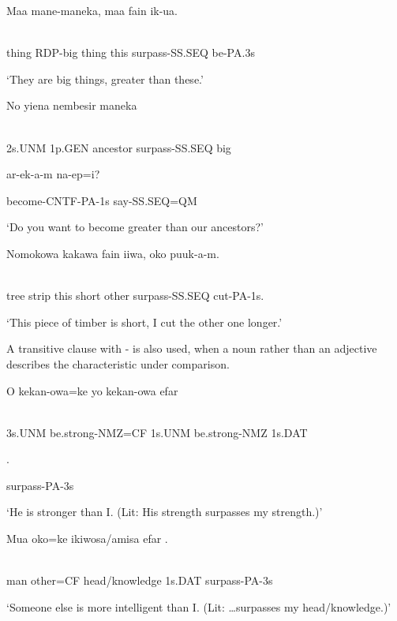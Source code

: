 \ea%
\label{ex:x1327}
\gll Maa  mane-maneka,  maa  fain    ik-ua. \\
      \\
\glt
\z

thing  RDP-big  thing  this  surpass-SS.SEQ  be-PA.3s

`They are big things, greater than these.'

\ea%
\label{ex:x1328}
\gll No  yiena  nembesir    maneka \\
      \\
\glt
\z

2s.UNM  1p.GEN  ancestor  surpass-SS.SEQ  big

ar-ek-a-m  na-ep=i?

become-CNTF-PA-1s  say-SS.SEQ=QM

`Do you want to become greater than our ancestors?'

\ea%
\label{ex:x1333}
\gll Nomokowa  kakawa  fain  iiwa,  oko    puuk-a-m. \\
      \\
\glt
\z

tree  strip  this  short  other  surpass-SS.SEQ  cut-PA-1s.

`This piece of timber is short, I cut the other one longer.'

A transitive clause with - is also used, when a noun rather than an adjective describes the characteristic under comparison. 

\ea%
\label{ex:x1329}
\gll O  kekan-owa=ke  yo  kekan-owa  efar \\
      \\
\glt
\z

3s.UNM  be.strong-NMZ=CF  1s.UNM  be.strong-NMZ  1s.DAT

.

surpass-PA-3s

`He is stronger than I. (Lit: His strength surpasses my strength.)'

\ea%
\label{ex:x1894}
\gll Mua  oko=ke  ikiwosa/amisa  efar  . \\
      \\
\glt
\z

man  other=CF  head/knowledge  1s.DAT  surpass-PA-3s

`Someone else is more intelligent than I. (Lit: {\dots}surpasses my head/knowledge.)'

